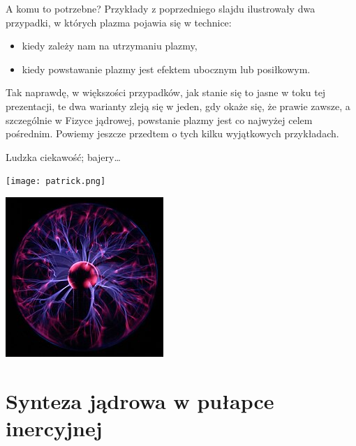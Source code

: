 \documentclass[10pt]{beamer}
\begin{document}
    \begin{frame}{A komu to potrzebne?}
        Przykłady z poprzedniego slajdu ilustrowały dwa przypadki, w których plazma pojawia się w technice:
        \begin{itemize}
            \item kiedy zależy nam na utrzymaniu plazmy,
            \item kiedy powstawanie plazmy jest efektem ubocznym lub posiłkowym.
        \end{itemize}
        Tak naprawdę, w większości przypadków, jak stanie się to jasne w toku tej prezentacji, te dwa warianty zleją się w jeden, gdy okaże się, że prawie zawsze, a szczególnie w Fizyce jądrowej, powstanie plazmy jest co najwyżej celem pośrednim. Powiemy jeszcze przedtem o tych kilku wyjątkowych przykładach.
    \end{frame}

    \begin{frame}{Ludzka ciekawość; bajery\dots}
        \begin{minipage}{0.49\textwidth}
            \centering
            \texttt{[image: patrick.png]}
        \end{minipage}
        \hfill
        \begin{minipage}{0.49\textwidth}
            \centering
            \includegraphics[width=0.8\linewidth]{lamp.jpg}
        \end{minipage}
    \end{frame}

    \section{Synteza jądrowa w pułapce inercyjnej}
\end{document}
